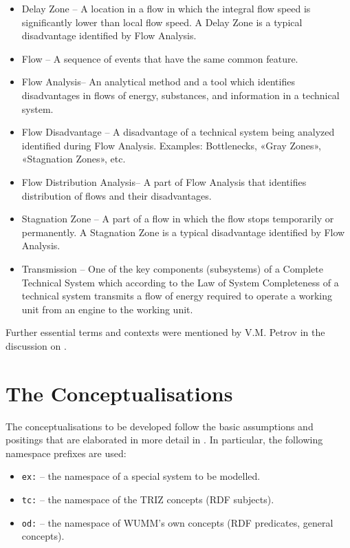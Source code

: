\documentclass[11pt,a4paper]{article}
\begin{document}
\begin{itemize}[noitemsep]
\item Delay Zone -- A location in a flow in which the integral flow speed is
  significantly lower than local flow speed. A Delay Zone is a typical
  disadvantage identified by Flow Analysis. 
\item Flow -- A sequence of events that have the same common feature.
\item  Flow Analysis-- An analytical method and a tool which identifies
  disadvantages in flows of energy, substances, and information in a technical
  system.
\item  Flow Disadvantage -- A disadvantage of a technical system being
  analyzed identified during Flow Analysis. Examples: Bottlenecks, «Gray
  Zones», «Stagnation Zones», etc.
\item Flow Distribution Analysis-- A part of Flow Analysis that identifies
  distribution of flows and their disadvantages. 
\item Stagnation Zone -- A part of a flow in which the flow stops temporarily
  or permanently. A Stagnation Zone is a typical disadvantage identified by
  Flow Analysis.
\item Transmission -- One of the key components (subsystems) of a Complete
  Technical System which according to the Law of System Completeness of a
  technical system transmits a flow of energy required to operate a working
  unit from an engine to the working unit.
\end{itemize}
Further essential terms and contexts were mentioned by V.M. Petrov in the
discussion on \cite{Eckardt2020}. 

\section{The Conceptualisations}

The conceptualisations to be developed follow the basic assumptions and
positings that are elaborated in more detail in \cite{Graebe2021}. In
particular, the following namespace prefixes are used:
\begin{itemize}[noitemsep]
\item \texttt{ex:} -- the namespace of a special system to be modelled. 
\item \texttt{tc:} -- the namespace of the TRIZ concepts (RDF subjects).
\item \texttt{od:} -- the namespace of WUMM's own concepts (RDF predicates,
  general concepts). 
\end{itemize}
\end{document}
